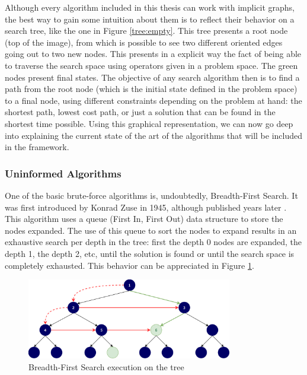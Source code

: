 Although every algorithm included in this thesis can work with implicit graphs,
the best way to gain some intuition about them is to reflect their behavior on
a search tree, like the one in Figure \ref{tree:empty}. This tree presents a
root node (top of the image), from which is possible to see two different
oriented edges going out to two new nodes. This presents in a explicit way the
fact of being able to traverse the search space using operators given in a
problem space. The green nodes present final states. The objective of any
search algorithm then is to find a path from the root node (which is the
initial state defined in the problem space) to a final node, using different
constraints depending on the problem at hand: the shortest path, lowest cost
path, or just a solution that can be found in the shortest time possible. Using
this graphical representation, we can now go deep into explaining the current
state of the art of the algorithms that will be included in the framework.\\

\subsubsection{Uninformed Algorithms}

One of the basic brute-force algorithms is, undoubtedly, Breadth-First Search.
It was first introduced by Konrad Zuse in 1945, although published years later
\cite{zuse-1972-plankalkul}. This algorithm uses a queue (First In, First Out)
data structure to store the nodes expanded. The use of this queue to sort the
nodes to expand results in an exhaustive search per depth in the tree: first
the depth 0 nodes are expanded, the depth 1, the depth 2, etc, until the
solution is found or until the search space is completely exhausted. This
behavior can be appreciated in Figure \ref{tree:bfs}.\\

\begin{figure}[ht]
\centering
\includegraphics[width=0.8\textwidth]{img/bfs.png}
\caption{Breadth-First Search execution on the tree}
\label{tree:bfs}
\end{figure}

